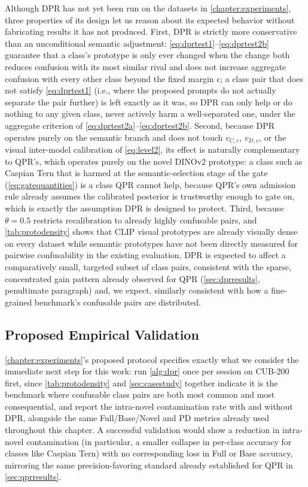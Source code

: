 \documentclass{iutbscthesis}
\begin{document}
Although DPR has not yet been run on the datasets in \autoref{chapter:experiments}, three properties of its design let us reason about its expected behavior without fabricating results it has not produced. First, DPR is strictly more conservative than an unconditional semantic adjustment: \autoref{eq:dprtest1}--\autoref{eq:dprtest2b} guarantee that a class's prototype is only ever changed when the change both reduces confusion with its most similar rival and does not increase aggregate confusion with every other class beyond the fixed margin $\epsilon$; a class pair that does not satisfy \autoref{eq:dprtest1} (i.e., where the proposed prompts do not actually separate the pair further) is left exactly as it was, so DPR can only help or do nothing to any given class, never actively harm a well-separated one, under the aggregate criterion of \autoref{eq:dprtest2a}--\autoref{eq:dprtest2b}. Second, because DPR operates purely on the semantic branch and does not touch $v_{C,c}$, $v_{D,c}$, or the visual inter-model calibration of \autoref{eq:level2}, its effect is naturally complementary to QPR's, which operates purely on the novel DINOv2 prototype: a class such as Caspian Tern that is harmed at the semantic-selection stage of the gate (\autoref{eq:gatequantities}) is a class QPR cannot help, because QPR's own admission rule already assumes the calibrated posterior is trustworthy enough to gate on, which is exactly the assumption DPR is designed to protect. Third, because $\theta = 0.5$ restricts recalibration to already highly confusable pairs, and \autoref{tab:protodensity} shows that CLIP visual prototypes are already visually dense on every dataset while semantic prototypes have not been directly measured for pairwise confusability in the existing evaluation, DPR is expected to affect a comparatively small, targeted subset of class pairs, consistent with the sparse, concentrated gain pattern already observed for QPR (\autoref{sec:dprresults}, penultimate paragraph) and, we expect, similarly consistent with how a fine-grained benchmark's confusable pairs are distributed.

\subsection{Proposed Empirical Validation}

\autoref{chapter:experiments}'s proposed protocol specifies exactly what we consider the immediate next step for this work: run \autoref{alg:dpr} once per session on CUB-200 first, since \autoref{tab:protodensity} and \autoref{sec:casestudy} together indicate it is the benchmark where confusable class pairs are both most common and most consequential, and report the intra-novel contamination rate with and without DPR, alongside the same Full/Base/Novel and PD metrics already used throughout this chapter. A successful validation would show a reduction in intra-novel contamination (in particular, a smaller collapse in per-class accuracy for classes like Caspian Tern) with no corresponding loss in Full or Base accuracy, mirroring the same precision-favoring standard already established for QPR in \autoref{sec:qprresults}.
\end{document}
